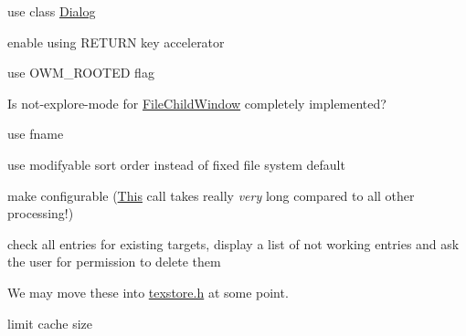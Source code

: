 \begin{DoxyRefList}
\item[\label{todo__todo000033}%
\Hypertarget{todo__todo000033}%
成员 \hyperlink{struct_execute_dialog_a1fb499c2dc131d2a497f734d736ec230}{Execute\+Dialog\+:\+:cmd} \mbox{[}M\+A\+X\+\_\+\+P\+A\+TH\mbox{]}]use class \hyperlink{struct_dialog}{Dialog}  
\item[\label{todo__todo000030}%
\Hypertarget{todo__todo000030}%
成员 \hyperlink{struct_file_child_window_a32a45a31f8f8ea8d9a2cf9f0a06553aa}{File\+Child\+Window\+:\+:activate\+\_\+entry} (\hyperlink{struct_pane}{Pane} $\ast$pane)]enable using R\+E\+T\+U\+RN key accelerator  
\item[\label{todo__todo000027}%
\Hypertarget{todo__todo000027}%
成员 \hyperlink{struct_file_child_window_a3c224e72029662287701798a817342b0}{File\+Child\+Window\+:\+:File\+Child\+Window} (H\+W\+ND hwnd, const \hyperlink{struct_file_child_wnd_info}{File\+Child\+Wnd\+Info} \&info)]use O\+W\+M\+\_\+\+R\+O\+O\+T\+ED flag 

Is not-\/explore-\/mode for \hyperlink{struct_file_child_window}{File\+Child\+Window} completely implemented?  
\item[\label{todo__todo000032}%
\Hypertarget{todo__todo000032}%
成员 \hyperlink{struct_file_child_window_aed746ad1a9c8ebb3d07032b111f402bd}{File\+Child\+Window\+:\+:jump\+\_\+to\+\_\+int} (L\+P\+C\+T\+S\+TR url)]use fname  
\item[\label{todo__todo000031}%
\Hypertarget{todo__todo000031}%
成员 \hyperlink{struct_file_child_window_a6966bc5ed4f9a7dec37670237ea871e9}{File\+Child\+Window\+:\+:scan\+\_\+entry} (\hyperlink{struct_entry}{Entry} $\ast$entry)]use modifyable sort order instead of fixed file system default  
\item[\label{todo__todo000029}%
\Hypertarget{todo__todo000029}%
成员 \hyperlink{struct_file_child_window_a150ccb0046f5e847a6129d33a3843da7}{File\+Child\+Window\+:\+:set\+\_\+curdir} (\hyperlink{struct_entry}{Entry} $\ast$entry)]make configurable (\hyperlink{namespace_this}{This} call takes really {\itshape very} long compared to all other processing!)  
\item[\label{todo__todo000017}%
\Hypertarget{todo__todo000017}%
成员 \hyperlink{struct_find_program_dlg_a8e701c215c3eae3295f2b1697f8fb9a8}{Find\+Program\+Dlg\+:\+:Check\+Entries} ()]check all entries for existing targets, display a list of not working entries and ask the user for permission to delete them  
\item[\label{todo__todo000002}%
\Hypertarget{todo__todo000002}%
组 \hyperlink{colormac_8h_amgrp2b0fc631908c5846d1f7ac04e11228ae}{Generic color packing macros. All inputs should be G\+Lubytes.} ]We may move these into \hyperlink{texstore_8h}{texstore.\+h} at some point.  
\item[\label{todo__todo000018}%
\Hypertarget{todo__todo000018}%
成员 \hyperlink{struct_icon_cache_aa765b3e3ca0eea6f221fa25ad6c11c7c}{Icon\+Cache\+:\+:extract} (L\+P\+C\+T\+S\+TR path, I\+C\+O\+N\+C\+A\+C\+H\+E\+\_\+\+F\+L\+A\+GS flags=I\+C\+F\+\_\+\+N\+O\+R\+M\+AL)]limit cache size 


\end{DoxyRefList}
